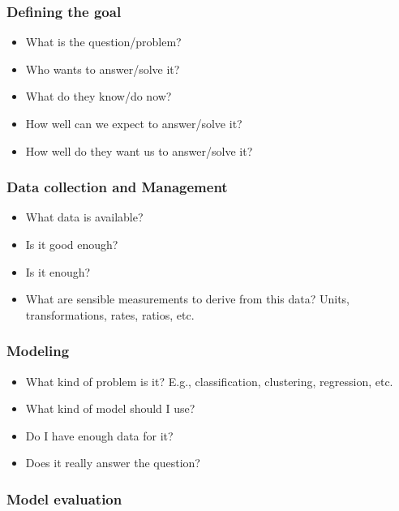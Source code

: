 \documentclass[]{article}
\theoremstyle{definition}
\theoremstyle{definition}
\theoremstyle{remark}
\begin{document}
\subsubsection{Defining the goal}\label{defining-the-goal}

\begin{itemize}
\itemsep1pt\parskip0pt
\item
  What is the question/problem?
\item
  Who wants to answer/solve it?
\item
  What do they know/do now?
\item
  How well can we expect to answer/solve it?
\item
  How well do they want us to answer/solve it?
\end{itemize}

\subsubsection{Data collection and
Management}\label{data-collection-and-management}

\begin{itemize}
\itemsep1pt\parskip0pt
\item
  What data is available?
\item
  Is it good enough?
\item
  Is it enough?
\item
  What are sensible measurements to derive from this data? Units,
  transformations, rates, ratios, etc.
\end{itemize}

\subsubsection{Modeling}\label{modeling}

\begin{itemize}
\itemsep1pt\parskip0pt
\item
  What kind of problem is it? E.g., classification, clustering,
  regression, etc.
\item
  What kind of model should I use?
\item
  Do I have enough data for it?
\item
  Does it really answer the question?
\end{itemize}

\subsubsection{Model evaluation}\label{model-evaluation}
\end{document}
